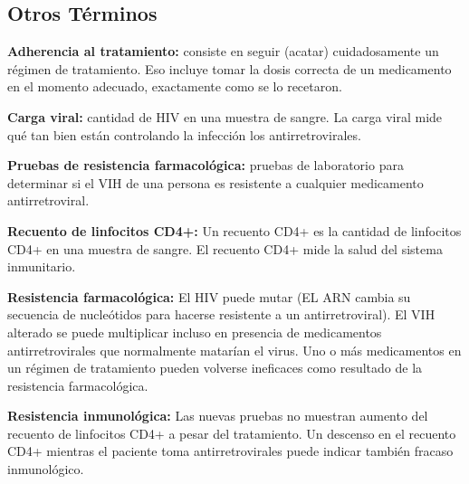   \subsection{Otros T\'erminos}
  \begin{description}
    \item \textbf{Adherencia al tratamiento:} consiste en seguir (acatar) cuidadosamente un r\'egimen de tratamiento. Eso incluye tomar la dosis correcta
      de un medicamento en el momento adecuado, exactamente como se lo recetaron.
    \item \textbf{Carga viral:} cantidad de HIV en una muestra de sangre. La carga viral mide qu\'e tan bien est\'an controlando la infecci\'on los
          antirretrovirales.
    \item \textbf{Pruebas de resistencia farmacol\'ogica:} pruebas de laboratorio para determinar si el VIH de una persona es resistente a cualquier
          medicamento antirretroviral.
    \item \textbf{Recuento de linfocitos CD4+:} Un recuento CD4+ es la cantidad de linfocitos CD4+ en una muestra de sangre. El recuento CD4+ mide la salud
      del sistema inmunitario.
    \item \textbf{Resistencia farmacol\'ogica:} El HIV puede mutar (EL ARN cambia su secuencia de nucle\'otidos para hacerse resistente a un antirretroviral). El VIH alterado se puede multiplicar incluso en presencia de medicamentos antirretrovirales que normalmente matar\'ian el virus. Uno o m\'as medicamentos en un r\'egimen de tratamiento pueden volverse ineficaces como resultado de la resistencia farmacol\'ogica.
    \item \textbf{Resistencia inmunol\'ogica:} Las nuevas pruebas no muestran aumento del recuento de linfocitos CD4+ a pesar del tratamiento. Un descenso en
      el recuento CD4+ mientras el paciente toma antirretrovirales puede indicar tambi\'en fracaso inmunol\'ogico.
  \end{description}

